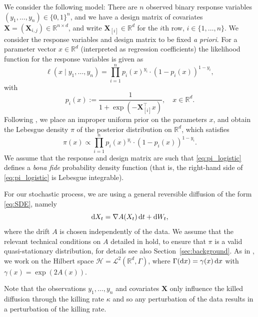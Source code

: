 \documentclass{aptpub}
\newcommand{\R}{\mathbb R}
\newcommand{\Rd}{\mathbb R^d}
\begin{document}
We consider the following model: There are
$n$ observed binary response variables $(y_1,\dots,y_n)\in \{0,1\}^n$, and we have a design matrix of covariates $\mathbf X = (\mathbf{X}_{i,j})\in \R^{n\times d}$, and write $\mathbf X_{[i]}\in \Rd$ for the $i$th row, $i\in \{1,\dots,n\}$. We consider the response variables and design matrix to be fixed \textit{a priori}.
For a parameter vector $x\in\Rd$ (interpreted as regression coefficients) the likelihood function for the response variables is given as 
\[
\ell(x\mid y_1,\dots,y_n) = 
\prod_{i=1}^n p_i(x)^{y_i} \cdot (1-p_i(x))^{1-y_i},
\]
with
\begin{equation*}
    p_i(x) := \frac{1}{1+\exp (-\mathbf X_{[i]}^\top x)},\quad x\in\Rd.
\end{equation*}
Following \cite{Pollock2020, Kumar2019}, we place an improper uniform prior on the parameters $x$, and obtain the Lebesgue density $\pi$ of the posterior distribution on $\Rd$, which satisfies
\begin{equation}
    \pi(x)\propto \prod_{i=1}^n p_i(x)^{y_i} \cdot (1-p_i(x))^{1-y_i}.
    \label{eq:pi_logistic}
\end{equation}
We assume that the response and design matrix are such that \eqref{eq:pi_logistic} defines a \textit{bona fide} probability density function (that is, the right-hand side of \eqref{eq:pi_logistic} is Lebesgue integrable).

For our stochastic process, we are using a general reversible diffusion of the form \eqref{eq:SDE}, namely
\begin{equation*}
    \dif X_t = \nabla A(X_t)\dif t + \dif W_t,
\end{equation*}
where the drift $A$ is chosen independently of the data. We assume that the relevant technical conditions on $A$ detailed in \cite{Wang2019TheoQSMC} hold, to ensure that $\pi$ is a valid quasi-stationary distribution, for details see also Section~\ref{sec:background}. As in \cite{Wang2019TheoQSMC}, we work on the Hilbert space $\mathcal H = \mathcal L^2(\Rd,\Gamma)$, where $\Gamma(\dif x)=\gamma(x)\dif x$ with $\gamma(x)=\exp(2A(x))$.

Note that the observations $y_1,\dots,y_n$ and covariates $\mathbf X$ only influence the killed diffusion through the killing rate $\kappa$ and so any perturbation of the data results in a perturbation of the killing rate. 
\end{document}
